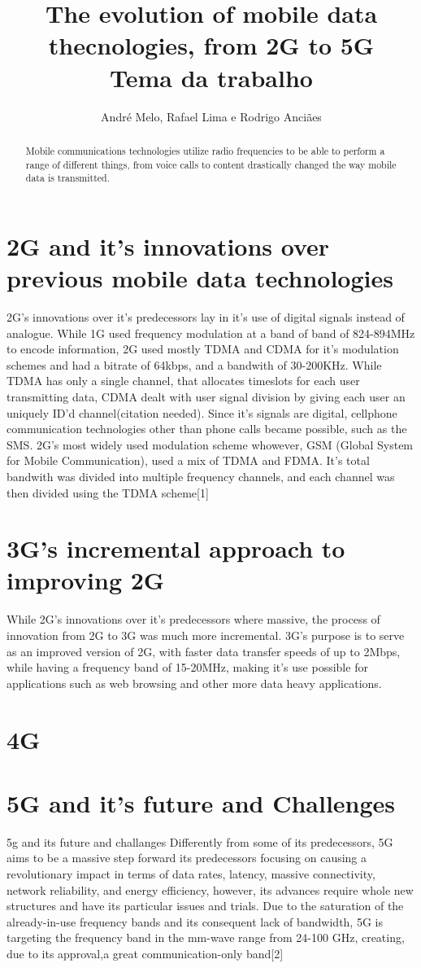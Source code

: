 \documentclass{article}
\title{The evolution of mobile data thecnologies, from 2G to 5G\\
	\large Tema da trabalho \\}
\author{André Melo, Rafael Lima e Rodrigo Anciães}
\begin{document}
\maketitle
\begin{abstract}
Mobile communications technologies utilize radio frequencies to be able to perform a range of different things, from voice calls to content drastically changed the way mobile data is transmitted.
\end{abstract}
\pagebreak

\section{2G and it's innovations over previous mobile data technologies}
2G's innovations over it's predecessors lay in it's use of digital signals instead of analogue. While 1G used frequency modulation at a band of band of 824-894MHz to encode information, 2G used mostly TDMA and CDMA for it's modulation schemes and had a bitrate of 64kbps, and a bandwith of 30-200KHz. While TDMA has only a single channel, that allocates timeslots for each user transmitting data, CDMA dealt with user signal division by giving each user an uniquely ID'd channel(citation needed). Since it's signals are digital, cellphone communication technologies other than phone calls became possible, such as the SMS. 2G's most widely used modulation scheme whowever, GSM (Global System for Mobile Communication), used a mix of TDMA and FDMA. It's total bandwith was divided into multiple frequency channels, and each channel was then divided using the TDMA scheme[1]

\section{3G's incremental approach to improving 2G}
While 2G's innovations over it's predecessors where massive, the process of innovation from 2G to 3G was much more incremental. 3G's purpose is to serve as an improved version of 2G, with faster data transfer speeds of up to 2Mbps, while having a frequency band of 15-20MHz, making it's use possible for applications such as web browsing and other more data heavy applications.

\section{4G}

\section{5G and it's future and Challenges}
5g and its future and challanges
Differently from some of its predecessors, 5G aims to be a massive step forward its predecessors focusing on causing a revolutionary impact in terms of data rates, latency, massive connectivity, network reliability, and energy efficiency, however, its advances require whole new structures and have its particular issues and trials. Due to the saturation of the already-in-use frequency bands and its consequent lack of bandwidth, 5G is targeting the frequency band in the mm-wave range from 24-100 GHz, creating, due to its approval,a great communication-only band[2]
\end{document}
